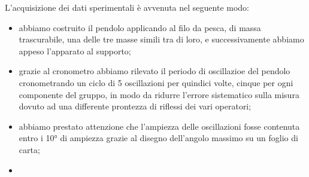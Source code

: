 L'acquisizione dei dati sperimentali è avvenuta nel seguente modo:
\begin{itemize}
	\item{abbiamo costruito il pendolo applicando al filo da pesca, di massa trascurabile, una delle tre masse simili tra di loro, e successivamente abbiamo appeso l'apparato al supporto;}
	\item{grazie al cronometro abbiamo rilevato il periodo di oscillazioe del pendolo cronometrando un ciclo di 5 oscillazioni per quindici volte, cinque per ogni componente del gruppo, in modo da ridurre l'errore sistematico sulla misura dovuto ad una differente prontezza di riflessi dei vari operatori;}
	\item{abbiamo prestato attenzione che l'ampiezza delle oscillazioni fosse contenuta entro i 10° di ampiezza grazie al disegno dell'angolo massimo su un foglio di carta;}
	\item{}
\end{itemize}
